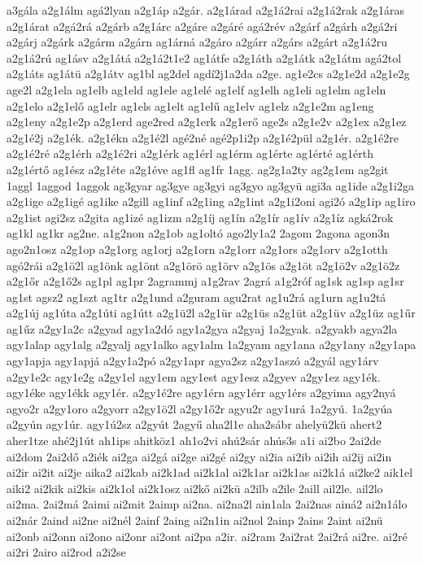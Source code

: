{a3gála
a2g1álm
agá2lyan
a2g1áp
a2gár.
a2g1árad
a2g1á2rai
a2g1á2rak
a2g1áras
a2g1árat
a2gá2rá
a2gárb
a2g1árc
a2gáre
a2gáré
agá2rév
a2gárf
a2gárh
a2gá2ri
a2gárj
a2gárk
a2gárm
a2gárn
ag1árná
a2gáro
a2gárr
a2gárs
a2gárt
a2g1á2ru
a2g1á2rú
ag1ásv
a2g1átá
a2g1á2t1e2
ag1átfe
a2g1áth
a2g1átk
a2g1átm
agá2tol
a2g1áts
ag1átü
a2g1átv
ag1bl
ag2del
agdí2j1a2da
a2ge.
ag1e2cs
a2g1e2d
a2g1e2g
age2l
a2g1ela
ag1elb
ag1eld
ag1ele
ag1elé
ag1elf
ag1elh
ag1eli
ag1elm
ag1eln
a2g1elo
a2g1elő
ag1elr
ag1els
ag1elt
ag1elű
ag1elv
ag1elz
a2g1e2m
ag1eng
a2g1eny
a2g1e2p
a2g1erd
age2red
a2g1erk
a2g1erő
age2s
a2g1e2v
a2g1ex
a2g1ez
a2g1é2j
a2g1ék.
a2g1ékn
a2g1é2l
agé2né
agé2p1i2p
a2g1é2pül
a2g1ér.
a2g1é2re
a2g1é2ré
a2g1érh
a2g1é2ri
a2g1érk
ag1érl
ag1érm
ag1érte
ag1érté
ag1érth
a2g1értő
ag1ész
a2g1éte
a2g1éve
ag1fl
ag1fr
1agg.
ag2g1a2ty
ag2g1em
ag2git
1aggl
1aggod
1aggok
ag3gyar
ag3gye
ag3gyi
ag3gyo
ag3gyü
agi3a
ag1ide
a2g1i2ga
a2g1ige
a2g1igé
ag1ike
a2gill
ag1inf
a2g1ing
a2g1int
a2g1i2oni
agi2ó
a2g1ip
ag1iro
a2g1ist
agi2sz
a2gita
ag1izé
ag1izm
a2g1íj
ag1ín
a2g1ír
ag1ív
a2g1íz
agká2rok
ag1kl
ag1kr
ag2ne.
a1g2non
a2g1ob
ag1oltó
ago2ly1a2
2agom
2agona
agon3n
ago2n1osz
a2g1op
a2g1org
ag1orj
a2g1orn
a2g1orr
a2g1ors
a2g1orv
a2g1otth
agó2rái
a2g1ö2l
ag1önk
ag1önt
a2g1örö
ag1örv
a2g1ös
a2g1öt
a2g1ö2v
a2g1ö2z
a2g1őr
a2g1ő2s
ag1pl
ag1pr
2agrammj
a1g2rav
2agrá
a1g2róf
ag1sk
ag1sp
ag1sr
ag1st
agsz2
ag1szt
ag1tr
a2g1und
a2guram
agu2rat
ag1u2rá
ag1urn
ag1u2tá
a2g1új
ag1úta
a2g1úti
ag1útt
a2g1ü2l
a2g1ür
a2g1üs
a2g1üt
a2g1üv
a2g1üz
ag1űr
ag1űz
a2gy1a2c
a2gyad
agy1a2dó
agy1a2gya
a2gyaj
1a2gyak.
a2gyakb
agya2la
agy1alap
agy1alg
a2gyalj
agy1alko
agy1alm
1a2gyam
agy1ana
a2gy1any
a2gy1apa
agy1apja
agy1apjá
a2gy1a2pó
a2gy1apr
agya2sz
a2gy1aszó
a2gyál
agy1árv
a2gy1e2c
agy1e2g
a2gy1el
agy1em
agy1est
agy1esz
a2gyev
a2gy1ez
agy1ék.
agy1éke
agy1ékk
agy1ér.
a2gy1é2re
agy1érn
agy1érr
agy1érs
a2gyima
agy2nyá
agyo2r
a2gy1oro
a2gyorr
a2gy1ö2l
a2gy1ő2r
agyu2r
agy1urá
1a2gyú.
1a2gyúa
a2gyún
agy1úr.
agy1ú2sz
a2gyút
2agyű
aha2l1e
aha2sábr
ahelyü2kü
ahert2
aher1tze
ahé2j1út
ah1ips
ahitköz1
ah1o2vi
ahú2sár
ahús3s
a1i
ai2bo
2ai2de
ai2dom
2ai2dő
a2iék
ai2ga
ai2gá
ai2ge
ai2gé
ai2gy
ai2ia
ai2ib
ai2ih
ai2ij
ai2in
ai2ir
ai2it
ai2je
aika2
ai2kab
ai2k1ad
ai2k1al
ai2k1ar
ai2k1as
ai2k1á
ai2ke2
aik1el
aiki2
ai2kik
ai2kis
ai2k1ol
ai2k1osz
ai2kő
ai2kü
a2ilb
a2ile
2aill
ail2le.
ail2lo
ai2ma.
2ai2má
2aimi
ai2mit
2aimp
ai2na.
ai2na2l
ain1ala
2ai2nas
ainá2
ai2n1álo
ai2nár
2aind
ai2ne
ai2nél
2ainf
2aing
ai2n1in
ai2nol
2ainp
2ains
2aint
ai2nü
ai2onb
ai2onn
ai2ono
ai2onr
ai2ont
ai2pa
a2ir.
ai2ram
2ai2rat
2ai2rá
ai2re.
ai2ré
ai2ri
2airo
ai2rod
a2i2se
}
